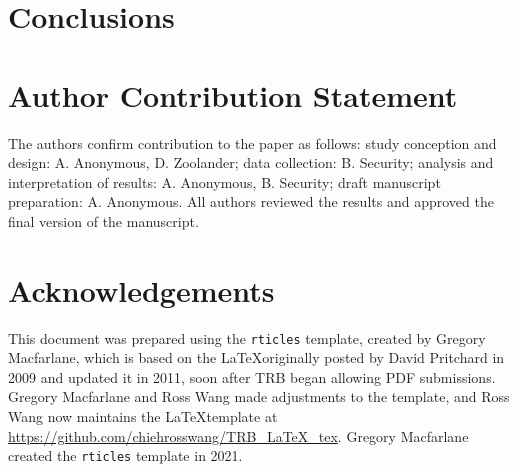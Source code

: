 \documentclass[]{tufte-book}
\begin{document}
\hypertarget{conclusions}{%
\chapter{Conclusions}\label{conclusions}}

\hypertarget{author-contribution-statement}{%
\chapter{Author Contribution
Statement}\label{author-contribution-statement}}

The authors confirm contribution to the paper as follows: study
conception and design: A. Anonymous, D. Zoolander; data collection: B.
Security; analysis and interpretation of results: A. Anonymous, B.
Security; draft manuscript preparation: A. Anonymous. All authors
reviewed the results and approved the final version of the manuscript.

\hypertarget{acknowledgements}{%
\chapter{Acknowledgements}\label{acknowledgements}}

This document was prepared using the \texttt{rticles} template, created
by Gregory Macfarlane, which is based on the \LaTeX originally posted by
David Pritchard in 2009 and updated it in 2011, soon after TRB began
allowing PDF submissions. Gregory Macfarlane and Ross Wang made
adjustments to the template, and Ross Wang now maintains the
\LaTeX template at \url{https://github.com/chiehrosswang/TRB_LaTeX_tex}.
Gregory Macfarlane created the \texttt{rticles} template in 2021.

\renewcommand\refname{References}

\end{document}
